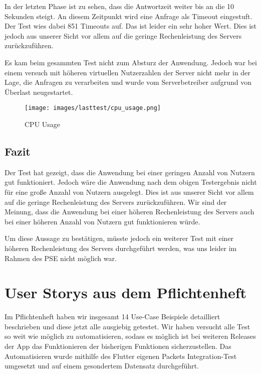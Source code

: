 \documentclass{qualitätssicherungsheft}
\begin{document}
In der letzten Phase ist zu sehen, dass die Antwortzeit weiter bis an die 10 Sekunden steigt. An diesem Zeitpunkt wird eine Anfrage als Timeout eingestuft. Der Test wies dabei 851 Timeouts auf. Das ist leider ein sehr hoher Wert. Dies ist jedoch aus unserer Sicht vor allem auf die geringe Rechenleistung des Servers zurückzuführen. 

Es kam beim gesammten Test nicht zum Absturz der Anwendung.
Jedoch war bei einem versuch mit höheren virtuellen Nutzerzahlen der Server nicht mehr in der Lage, die Anfragen zu verarbeiten und wurde vom Serverbetreiber aufgrund von Überlast neugestartet.

\begin{figure}
    \centering
        \texttt{[image: images/lasttest/cpu\_usage.png]}
        \caption[center]{CPU Usage}
        \label{fig:cpu_usage}
\end{figure}

\subsection{Fazit}
Der Test hat gezeigt, dass die Anwendung bei einer geringen Anzahl von Nutzern gut funktioniert. Jedoch wäre die Anwendung nach dem obigen Testergebnis nicht für eine große Anzahl von Nutzern ausgelegt. Dies ist aus unserer Sicht vor allem auf die geringe Rechenleistung des Servers zurückzuführen. Wir sind der Meinung, dass die Anwendung bei einer höheren Rechenleistung des Servers auch bei einer höheren Anzahl von Nutzern gut funktionieren würde.

Um diese Aussage zu bestätigen, müsste jedoch ein weiterer Test mit einer höheren Rechenleistung des Servers durchgeführt werden, was uns leider im Rahmen des PSE nicht möglich war.
\newpage

\section{User Storys aus dem Pflichtenheft}

Im Pflichtenheft haben wir insgesamt 14 Use-Case Beispiele detailliert beschrieben und diese jetzt alle ausgiebig getestet. Wir haben versucht alle Test so weit wie möglich zu automatisieren, sodass es möglich ist bei weiteren Releases der App das Funktionieren der bisherigen Funktionen sicherzustellen. Das Automatisieren wurde mithilfe des Flutter eigenen Packets Integration-Test umgesetzt und auf einem gesondertem Datensatz durchgeführt.
\end{document}
